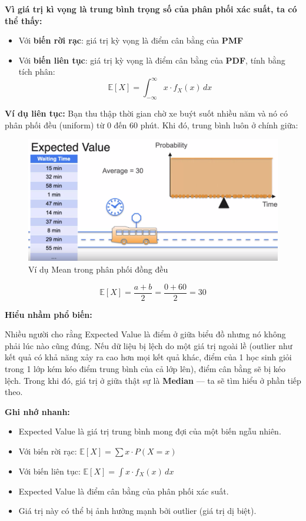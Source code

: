 \documentclass[11pt]{article}
\begin{document}
\vspace{1em}

\textbf{Vì giá trị kì vọng là trung bình trọng số của phân phối xác suất, ta có thể thấy:}
\begin{itemize}
    \item Với \textbf{biến rời rạc}: giá trị kỳ vọng là điểm cân bằng của \textbf{PMF}
    \item Với \textbf{biến liên tục}: giá trị kỳ vọng là điểm cân bằng của \textbf{PDF}, tính bằng tích phân:
    \[
    \mathbb{E}[X] = \int_{-\infty}^{\infty} x \cdot f_X(x) \, dx
    \]
\end{itemize}

\vspace{1em}

\textbf{Ví dụ liên tục:} Bạn thu thập thời gian chờ xe buýt suốt nhiều năm và nó có phân phối đều (uniform) từ 0 đến 60 phút. Khi đó, trung bình luôn ở chính giữa:
\begin{figure}[H]
    \centering %
    \includegraphics[width=0.7\linewidth]{images/equalDistribution.png}
    \caption{Ví dụ Mean trong phân phối đồng đều}
\end{figure}
\[
\mathbb{E}[X] = \frac{a + b}{2} = \frac{0 + 60}{2} = 30
\]


\vspace{1em}

\textbf{Hiểu nhầm phổ biến:}

Nhiều người cho rằng Expected Value là điểm ở giữa biểu đồ  nhưng nó không phải lúc nào cũng đúng. Nếu dữ liệu bị lệch do một giá trị ngoài lề (outlier như kết quả có khả năng xảy ra cao hơn mọi kết quả khác, điểm của 1 học sinh giỏi trong 1 lớp kém  kéo điểm trung bình của cả lớp lên), điểm cân bằng sẽ bị kéo lệch. Trong khi đó, giá trị ở giữa thật sự là \textbf{Median} — ta sẽ tìm hiểu ở phần tiếp theo.

\vspace{1em}

\begin{summarybox}
    \textbf{Ghi nhớ nhanh:}
    \begin{itemize}
        \item Expected Value là giá trị trung bình mong đợi của một biến ngẫu nhiên.
        \item Với biến rời rạc: $\mathbb{E}[X] = \sum x \cdot P(X = x)$
        \item Với biến liên tục: $\mathbb{E}[X] = \int x \cdot f_X(x) \, dx$
        \item Expected Value là điểm cân bằng của phân phối xác suất.
        \item Giá trị này có thể bị ảnh hưởng mạnh bởi outlier (giá trị dị biệt).
    \end{itemize}
\end{summarybox}
\end{document}
